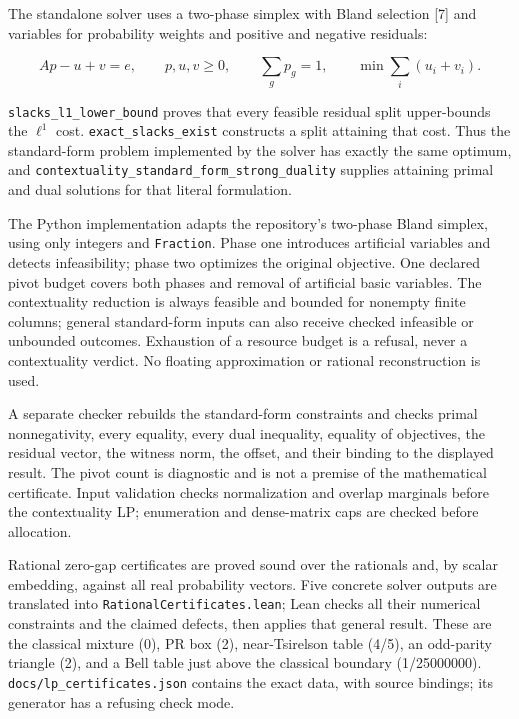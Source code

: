 \documentclass[
  10pt,
]{article}
\begin{document}
The standalone solver uses a two-phase simplex with Bland selection {[}7{]} and variables for probability weights and positive and negative residuals:

\protect\hypertarget{math-E0021-0014}{}{\[
Ap-u+v=e,\qquad p,u,v\geq0,\qquad \sum_g p_g=1,
\qquad\min\sum_i(u_i+v_i).
\]}

\texttt{slacks\_l1\_lower\_bound} proves that every feasible residual split upper-bounds the \protect\hypertarget{math-E0022-0015}{}{\(\ell^1\)} cost. \texttt{exact\_slacks\_exist} constructs a split attaining that cost. Thus the standard-form problem implemented by the solver has exactly the same optimum, and \texttt{contextuality\_standard\_form\_strong\_duality} supplies attaining primal and dual solutions for that literal formulation.

The Python implementation adapts the repository's two-phase Bland simplex, using only integers and \texttt{Fraction}. Phase one introduces artificial variables and detects infeasibility; phase two optimizes the original objective. One declared pivot budget covers both phases and removal of artificial basic variables. The contextuality reduction is always feasible and bounded for nonempty finite columns; general standard-form inputs can also receive checked infeasible or unbounded outcomes. Exhaustion of a resource budget is a refusal, never a contextuality verdict. No floating approximation or rational reconstruction is used.

A separate checker rebuilds the standard-form constraints and checks primal nonnegativity, every equality, every dual inequality, equality of objectives, the residual vector, the witness norm, the offset, and their binding to the displayed result. The pivot count is diagnostic and is not a premise of the mathematical certificate. Input validation checks normalization and overlap marginals before the contextuality LP; enumeration and dense-matrix caps are checked before allocation.

Rational zero-gap certificates are proved sound over the rationals and, by scalar embedding, against all real probability vectors. Five concrete solver outputs are translated into \texttt{RationalCertificates.lean}; Lean checks all their numerical constraints and the claimed defects, then applies that general result. These are the classical mixture (0), PR box (2), near-Tsirelson table (4/5), an odd-parity triangle (2), and a Bell table just above the classical boundary (1/25000000). \texttt{docs/lp\_certificates.json} contains the exact data, with source bindings; its generator has a refusing check mode.
\end{document}
